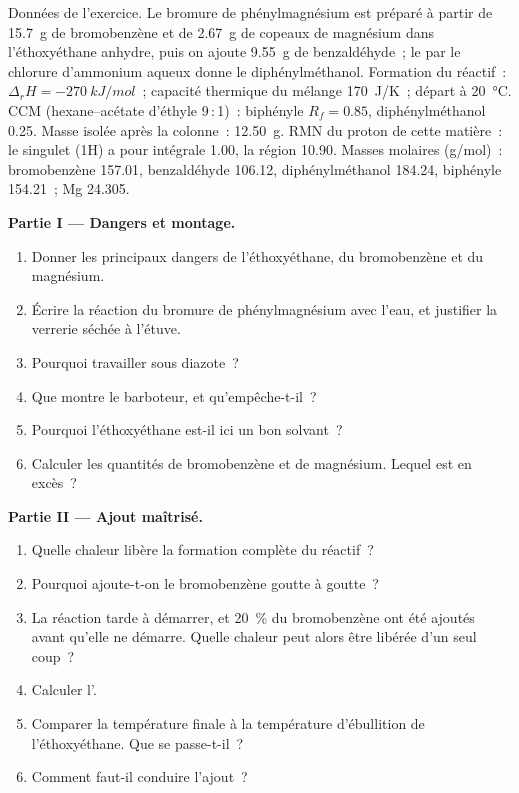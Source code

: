 \begin{problem}
\label{pb:b2:lab-techniques-2:1}
Données de l'exercice. Le bromure de phénylmagnésium est préparé à partir de \qty{15.7}{g} de
bromobenzène et de \qty{2.67}{g} de copeaux de magnésium dans l'éthoxyéthane anhydre, puis on ajoute
\qty{9.55}{g} de benzaldéhyde~; le  par le chlorure d'ammonium aqueux donne le
diphénylméthanol. Formation du réactif~: $\Delta_rH =
\qty{-270}{kJ/mol}$~; capacité thermique du mélange \qty{170}{J/K}~; départ à \qty{20}{\degreeCelsius}.
CCM (hexane--acétate d'éthyle 9\,:\,1)~: biphényle $R_f = 0.85$, diphénylméthanol 0.25. Masse isolée
après la colonne~: \qty{12.50}{g}. RMN du proton de cette matière~: le singulet  (1H) a pour
intégrale 1.00, la région  10.90. Masses molaires (\unit{g/mol})~: bromobenzène 157.01,
benzaldéhyde 106.12, diphénylméthanol 184.24, biphényle 154.21~; Mg 24.305.

\medskip
\noindent\textbf{Partie I --- Dangers et montage.}
\begin{enumerate}
  \item Donner les principaux dangers de l'éthoxyéthane, du bromobenzène et du magnésium.
  \item Écrire la réaction du bromure de phénylmagnésium avec l'eau, et justifier la verrerie séchée à l'étuve.
  \item Pourquoi travailler sous diazote~?
  \item Que montre le barboteur, et qu'empêche-t-il~?
  \item Pourquoi l'éthoxyéthane est-il ici un bon solvant~?
  \item Calculer les quantités de bromobenzène et de magnésium. Lequel est en excès~?
\end{enumerate}

\medskip
\noindent\textbf{Partie II --- Ajout maîtrisé.}
\begin{enumerate}[resume]
  \item Quelle chaleur libère la formation complète du réactif~?
  \item Pourquoi ajoute-t-on le bromobenzène goutte à goutte~?
  \item La réaction tarde à démarrer, et 20~\% du bromobenzène ont été ajoutés avant qu'elle ne démarre.
        Quelle chaleur peut alors être libérée d'un seul coup~?
  \item Calculer l'.
  \item Comparer la température finale à la température d'ébullition de l'éthoxyéthane. Que se passe-t-il~?
  \item Comment faut-il conduire l'ajout~?
\end{enumerate}


\end{problem}
